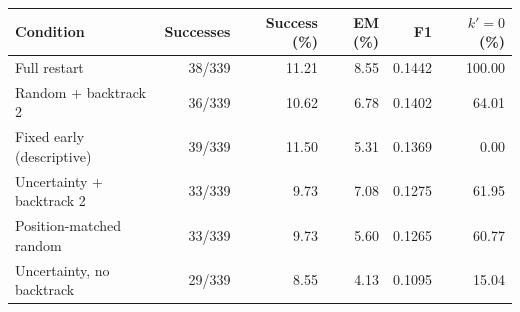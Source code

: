\begin{tabular}{@{}lrrrrr@{}}
\toprule
Condition & Successes & Success (\%) & EM (\%) & F1 & $k'=0$ (\%) \\
\midrule
Full restart & 38/339 & 11.21 & 8.55 & 0.1442 & 100.00 \\
Random + backtrack 2 & 36/339 & 10.62 & 6.78 & 0.1402 & 64.01 \\
Fixed early (descriptive) & 39/339 & 11.50 & 5.31 & 0.1369 & 0.00 \\
Uncertainty + backtrack 2 & 33/339 & 9.73 & 7.08 & 0.1275 & 61.95 \\
Position-matched random & 33/339 & 9.73 & 5.60 & 0.1265 & 60.77 \\
Uncertainty, no backtrack & 29/339 & 8.55 & 4.13 & 0.1095 & 15.04 \\
\bottomrule
\end{tabular}
